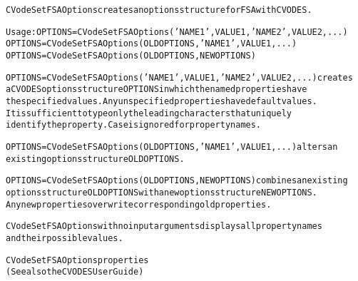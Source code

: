 \begin{alltt}
CVodeSetFSAOptions creates an options structure for FSA with CVODES.

   Usage: OPTIONS = CVodeSetFSAOptions('NAME1',VALUE1,'NAME2',VALUE2,...)
          OPTIONS = CVodeSetFSAOptions(OLDOPTIONS,'NAME1',VALUE1,...)
          OPTIONS = CVodeSetFSAOptions(OLDOPTIONS,NEWOPTIONS)

   OPTIONS = CVodeSetFSAOptions('NAME1',VALUE1,'NAME2',VALUE2,...) creates 
   a CVODES options structure OPTIONS in which the named properties have 
   the specified values. Any unspecified properties have default values. 
   It is sufficient to type only the leading characters that uniquely 
   identify the property. Case is ignored for property names. 
   
   OPTIONS = CVodeSetFSAOptions(OLDOPTIONS,'NAME1',VALUE1,...) alters an 
   existing options structure OLDOPTIONS.
   
   OPTIONS = CVodeSetFSAOptions(OLDOPTIONS,NEWOPTIONS) combines an existing 
   options structure OLDOPTIONS with a new options structure NEWOPTIONS. 
   Any new properties overwrite corresponding old properties. 
   
   CVodeSetFSAOptions with no input arguments displays all property names 
   and their possible values.
   
CVodeSetFSAOptions properties
(See also the CVODES User Guide)


\end{alltt}
